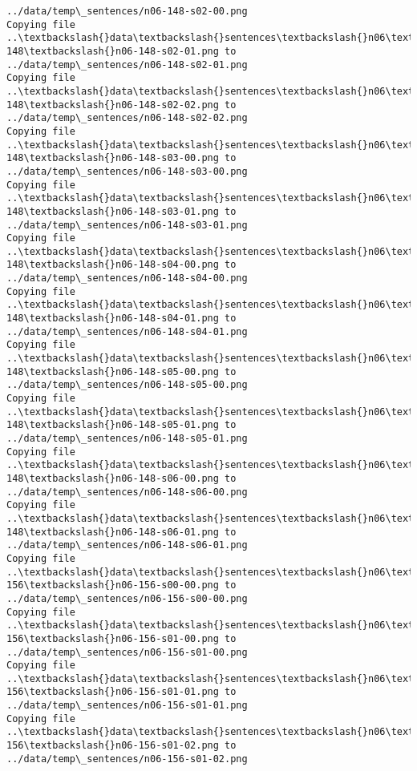 \documentclass[11pt]{article}
\begin{document}
\begin{Verbatim}[commandchars=\\\{\}]
../data/temp\_sentences/n06-148-s02-00.png
Copying file ..\textbackslash{}data\textbackslash{}sentences\textbackslash{}n06\textbackslash{}n06-148\textbackslash{}n06-148-s02-01.png to
../data/temp\_sentences/n06-148-s02-01.png
Copying file ..\textbackslash{}data\textbackslash{}sentences\textbackslash{}n06\textbackslash{}n06-148\textbackslash{}n06-148-s02-02.png to
../data/temp\_sentences/n06-148-s02-02.png
Copying file ..\textbackslash{}data\textbackslash{}sentences\textbackslash{}n06\textbackslash{}n06-148\textbackslash{}n06-148-s03-00.png to
../data/temp\_sentences/n06-148-s03-00.png
Copying file ..\textbackslash{}data\textbackslash{}sentences\textbackslash{}n06\textbackslash{}n06-148\textbackslash{}n06-148-s03-01.png to
../data/temp\_sentences/n06-148-s03-01.png
Copying file ..\textbackslash{}data\textbackslash{}sentences\textbackslash{}n06\textbackslash{}n06-148\textbackslash{}n06-148-s04-00.png to
../data/temp\_sentences/n06-148-s04-00.png
Copying file ..\textbackslash{}data\textbackslash{}sentences\textbackslash{}n06\textbackslash{}n06-148\textbackslash{}n06-148-s04-01.png to
../data/temp\_sentences/n06-148-s04-01.png
Copying file ..\textbackslash{}data\textbackslash{}sentences\textbackslash{}n06\textbackslash{}n06-148\textbackslash{}n06-148-s05-00.png to
../data/temp\_sentences/n06-148-s05-00.png
Copying file ..\textbackslash{}data\textbackslash{}sentences\textbackslash{}n06\textbackslash{}n06-148\textbackslash{}n06-148-s05-01.png to
../data/temp\_sentences/n06-148-s05-01.png
Copying file ..\textbackslash{}data\textbackslash{}sentences\textbackslash{}n06\textbackslash{}n06-148\textbackslash{}n06-148-s06-00.png to
../data/temp\_sentences/n06-148-s06-00.png
Copying file ..\textbackslash{}data\textbackslash{}sentences\textbackslash{}n06\textbackslash{}n06-148\textbackslash{}n06-148-s06-01.png to
../data/temp\_sentences/n06-148-s06-01.png
Copying file ..\textbackslash{}data\textbackslash{}sentences\textbackslash{}n06\textbackslash{}n06-156\textbackslash{}n06-156-s00-00.png to
../data/temp\_sentences/n06-156-s00-00.png
Copying file ..\textbackslash{}data\textbackslash{}sentences\textbackslash{}n06\textbackslash{}n06-156\textbackslash{}n06-156-s01-00.png to
../data/temp\_sentences/n06-156-s01-00.png
Copying file ..\textbackslash{}data\textbackslash{}sentences\textbackslash{}n06\textbackslash{}n06-156\textbackslash{}n06-156-s01-01.png to
../data/temp\_sentences/n06-156-s01-01.png
Copying file ..\textbackslash{}data\textbackslash{}sentences\textbackslash{}n06\textbackslash{}n06-156\textbackslash{}n06-156-s01-02.png to
../data/temp\_sentences/n06-156-s01-02.png

\end{Verbatim}
\end{document}
